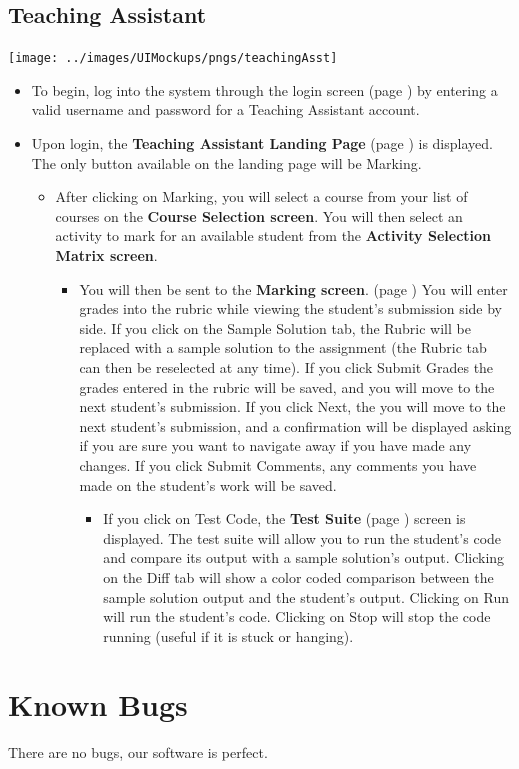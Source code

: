 \documentclass{article}
\begin{document}
\subsection{Teaching Assistant}
\centerline{\texttt{[image: ../images/UIMockups/pngs/teachingAsst]}}
\begin{itemize}
  \item To begin, log into the system through the login screen (page \pageref{login})
    by entering a valid username and password for a Teaching Assistant account.
  \item Upon login, the \textbf{Teaching Assistant Landing Page} (page \pageref{
    landPg}) is displayed. The only button available on the landing page will be 
    Marking.
    \begin{itemize}
      \item After clicking on Marking, you will select a course from your list of courses
	on the \textbf{Course Selection screen}. You will then select an activity
	to mark for an available student from the \textbf{Activity Selection Matrix
	  screen}.
	\begin{itemize}
	  \item You will then be sent to the \textbf{Marking screen}. (page
	    \pageref{marking}) You will enter grades into the rubric while viewing 
	    the student's submission side by side. If you click on the Sample Solution 
	    tab, the Rubric will be replaced with a sample solution to the assignment 
	    (the Rubric tab can then be reselected at any time). If you click Submit 
	    Grades the grades entered in the rubric will be saved, and you will 
	    move to the next student's submission. If you click Next, the you will 
	    move to the next student's submission, and a confirmation will be displayed 
	    asking if you are sure you want to navigate away if you have made any 
	    changes. If you click Submit Comments, any comments you have made 
	    on the student's work will be saved.
	    \begin{itemize}
	      \item If you click on Test Code, the \textbf{Test Suite} (page 
		\pageref{testSuite}) screen is displayed. The test suite will allow you 
		to run the student's code and compare its output with a sample 
		solution's output. Clicking on the Diff tab will show a color coded 
		comparison between the sample solution output and the student's 
		output. Clicking on Run will run the student's code. Clicking on Stop 
		will stop the code running (useful if it is stuck or hanging).
	    \end{itemize}
	\end{itemize}
    \end{itemize}
\end{itemize}

\section{Known Bugs}
There are no bugs, our software is perfect.
\end{document}
